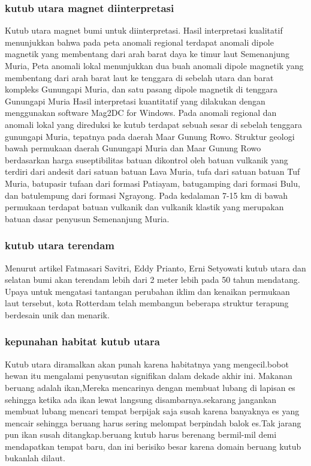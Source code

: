 \subsubsection{kutub utara magnet diinterpretasi}
		Kutub utara magnet bumi untuk diinterpretasi. Hasil interpretasi kualitatif menunjukkan bahwa pada peta anomali regional terdapat anomali dipole 
	magnetik yang membentang dari arah barat daya ke timur laut Semenanjung Muria, Peta anomali lokal menunjukkan dua buah anomali dipole magnetik yang 
	membentang dari arah barat laut ke tenggara di sebelah utara dan barat kompleks Gunungapi Muria, dan satu pasang dipole magnetik di tenggara Gunungapi
	Muria Hasil interpretasi kuantitatif yang dilakukan dengan menggunakan software Mag2DC for Windows. Pada anomali regional dan anomali lokal yang direduksi
	ke kutub terdapat sebuah sesar di sebelah tenggara gunungapi Muria, tepatnya pada daerah Maar Gunung Rowo. Struktur geologi bawah permukaan daerah 
	Gunungapi Muria dan Maar Gunung Rowo berdasarkan harga suseptibilitas batuan dikontrol oleh batuan vulkanik yang terdiri dari andesit dari 
	satuan batuan Lava Muria, tufa dari satuan batuan Tuf Muria, batupasir tufaan dari formasi Patiayam, batugamping dari formasi Bulu, dan 
	batulempung dari formasi Ngrayong. Pada kedalaman 7-15 km di bawah permukaan terdapat batuan vulkanik dan vulkanik klastik yang merupakan 
	batuan dasar penyusun Semenanjung Muria.
	
\subsubsection {kutub utara terendam}
		Menurut artikel Fatmasari Savitri, Eddy Prianto, Erni Setyowati kutub utara dan selatan bumi akan terendam lebih dari 2 meter lebih pada 50 
	tahun mendatang. Upaya untuk mengatasi tantangan perubahan iklim dan kenaikan permukaan laut tersebut, kota Rotterdam telah membangun beberapa 
	struktur terapung berdesain unik dan menarik. 
	
\subsubsection {kepunahan habitat kutub utara}
		Kutub utara diramalkan akan punah karena habitatnya yang mengecil.bobot hewan itu mengalami penyusutan signifikan dalam dekade akhir ini.
	Makanan beruang adalah ikan,Mereka mencarinya dengan membuat lubang di lapisan es sehingga ketika ada ikan lewat langsung disambarnya.sekarang 
	jangankan membuat lubang mencari tempat berpijak saja susah karena banyaknya es yang mencair sehingga beruang harus sering melompat berpindah 
	balok es.Tak jarang pun ikan susah ditangkap.beruang kutub harus berenang bermil-mil demi mendapatkan tempat baru, dan ini berisiko besar karena 
	domain beruang kutub bukanlah dilaut.
	
		


